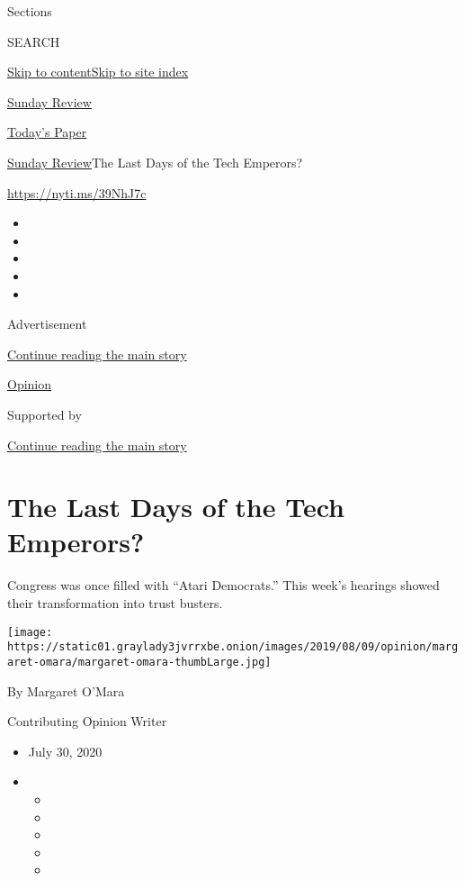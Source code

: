 Sections

SEARCH

\protect\hyperlink{site-content}{Skip to
content}\protect\hyperlink{site-index}{Skip to site index}

\href{https://www.nytimes3xbfgragh.onion/section/opinion/sunday}{Sunday
Review}

\href{https://myaccount.nytimes3xbfgragh.onion/auth/login?response_type=cookie\&client_id=vi}{}

\href{https://www.nytimes3xbfgragh.onion/section/todayspaper}{Today's
Paper}

\href{/section/opinion/sunday}{Sunday Review}\textbar{}The Last Days of
the Tech Emperors?

\href{https://nyti.ms/39NhJ7c}{https://nyti.ms/39NhJ7c}

\begin{itemize}
\item
\item
\item
\item
\item
\end{itemize}

Advertisement

\protect\hyperlink{after-top}{Continue reading the main story}

\href{/section/opinion}{Opinion}

Supported by

\protect\hyperlink{after-sponsor}{Continue reading the main story}

\hypertarget{the-last-days-of-the-tech-emperors}{%
\section{The Last Days of the Tech
Emperors?}\label{the-last-days-of-the-tech-emperors}}

Congress was once filled with ``Atari Democrats.'' This week's hearings
showed their transformation into trust busters.

\texttt{[image: https://static01.graylady3jvrrxbe.onion/images/2019/08/09/opinion/margaret-omara/margaret-omara-thumbLarge.jpg]}

By Margaret O'Mara

Contributing Opinion Writer

\begin{itemize}
\item
  July 30, 2020
\item
  \begin{itemize}
  \item
  \item
  \item
  \item
  \item
  \end{itemize}
\end{itemize}

